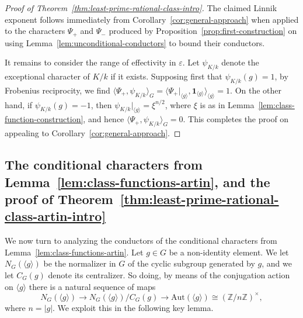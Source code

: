 \documentclass[12pt]{amsart}
\theoremstyle{definition} \newtheorem{definition}[theorem]{Definition}
\theoremstyle{example} \newtheorem{example}[theorem]{Example}
\theoremstyle{remark} \newtheorem{remark}{Remark}[theorem]
\numberwithin{equation}{section}
\numberwithin{theorem}{section}
\renewcommand{\epsilon}{\varepsilon}
\begin{document}
	\begin{proof} [Proof of Theorem~\ref{thm:least-prime-rational-class-intro}]
		The claimed Linnik exponent follows immediately from Corollary~\ref{cor:general-approach} when applied to the characters $\Psi_+$ and $\Psi_-$ produced by Proposition~\ref{prop:first-construction} on using Lemma~\ref{lem:unconditional-conductors} to bound their conductors.
		
		It remains to consider the range of effectivity in $\epsilon$.  Let $\psi_{K/k}$ denote the exceptional character of $K/k$ if it exists.  Supposing first that $\psi_{K/k}(g) = 1$, by Frobenius reciprocity, we find $\langle \Psi_+, \psi_{K/k} \rangle_G = \langle \Psi_+|_{\langle g \rangle}, \mathbf{1}_{\langle g \rangle} \rangle_{\langle g \rangle} = 1$.  On the other hand, if $\psi_{K/k}(g) = -1$, then $\psi_{K/k}|_{\langle g \rangle} = \xi^{n/2}$, where $\xi$ is as in Lemma~\ref{lem:class-function-construction}, and hence $\langle \Psi_+, \psi_{K/k} \rangle_G = 0$.  This completes the proof on appealing to Corollary~\ref{cor:general-approach}.
	\end{proof} 
	
\subsection{The conditional characters from Lemma~\ref{lem:class-functions-artin}, and the proof of Theorem~\ref{thm:least-prime-rational-class-artin-intro}}	
	
	We now turn to analyzing the conductors of the conditional characters from Lemma~\ref{lem:class-functions-artin}.  Let $g \in G$ be a non-identity element.  We let $N_G(\langle g \rangle)$ be the normalizer in $G$ of the cyclic subgroup generated by $g$, and we let $C_G(g)$ denote its centralizer.  So doing, by means of the conjugation action on $\langle g \rangle$ there is a natural sequence of maps
		\[
			N_G(\langle g \rangle) 
				\to N_G(\langle g \rangle) / C_G(g)
				\to \mathrm{Aut}(\langle g \rangle)
				\cong (\mathbb{Z}/n\mathbb{Z})^\times,
		\]
	where $n = |g|$.  We exploit this in the following key lemma.
	
\end{document}
